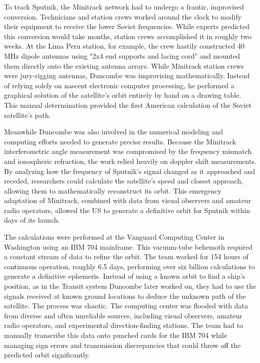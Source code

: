 To track Sputnik, the Minitrack network had to undergo a frantic, improvised conversion. Technicians and station crews worked around the clock to modify their equipment to receive the lower Soviet frequencies. While experts predicted this conversion would take months, station crews accomplished it in roughly two weeks. At the Lima Peru station, for example, the crew hastily constructed 40 MHz dipole antennas using "2x4 end supports and lacing cord" and mounted them directly onto the existing antenna arrays. While Minitrack station crews were jury-rigging antennas, Duncombe was improvising mathematically. Instead of relying solely on nascent electronic computer processing, he performed a graphical solution of the satellite's orbit entirely by hand on a drawing table. This manual determination provided the first American calculation of the Soviet satellite's path. 

Meanwhile Duncombe was also involved in the numerical modeling and computing efforts needed to generate precise results. Because the Minitrack interferometric angle measurement was compromised by the frequency mismatch and ionospheric refraction, the work relied heavily on doppler shift measurements. By analyzing how the frequency of Sputnik's signal changed as it approached and receded, researchers could calculate the satellite's speed and closest approach, allowing them to mathematically reconstruct its orbit. This emergency adaptation of Minitrack, combined with data from visual observers and amateur radio operators, allowed the US to generate a definitive orbit for Sputnik within days of its launch. 

The calculations were performed at the Vanguard Computing Center in Washington using an IBM 704 mainframe. This vacuum-tube behemoth required a constant stream of data to refine the orbit. The team worked for 154 hours of continuous operation, roughly 6.5 days, performing over six billion calculations to generate a definitive ephemeris. Instead of using a known orbit to find a ship's position, as in the Transit system Duncombe later worked on, they had to use the signals received at known ground locations to deduce the unknown path of the satellite. The process was chaotic. The computing center was flooded with data from diverse and often unreliable sources, including visual observers, amateur radio operators, and experimental direction-finding stations. The team had to manually transcribe this data onto punched cards for the IBM 704 while managing sign errors and transmission discrepancies that could throw off the predicted orbit significantly. 


